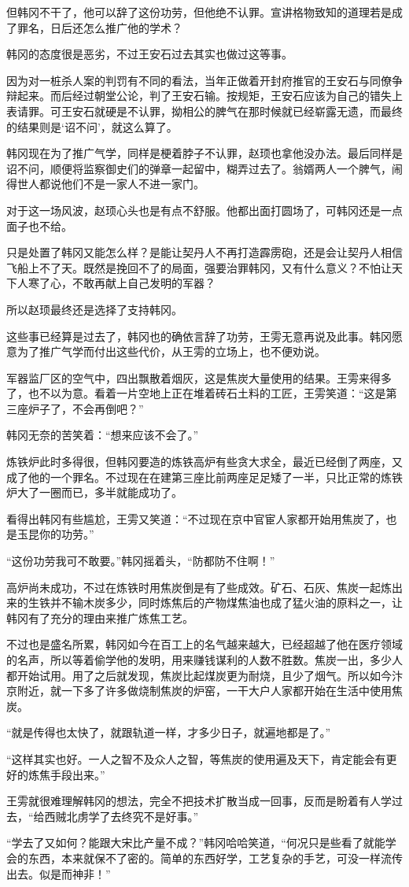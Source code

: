 但韩冈不干了，他可以辞了这份功劳，但他绝不认罪。宣讲格物致知的道理若是成了罪名，日后还怎么推广他的学术？

韩冈的态度很是恶劣，不过王安石过去其实也做过这等事。

因为对一桩杀人案的判罚有不同的看法，当年正做着开封府推官的王安石与同僚争辩起来。而后经过朝堂公论，判了王安石输。按规矩，王安石应该为自己的错失上表请罪。可王安石就硬是不认罪，拗相公的脾气在那时候就已经崭露无遗，而最终的结果则是‘诏不问’，就这么算了。

韩冈现在为了推广气学，同样是梗着脖子不认罪，赵顼也拿他没办法。最后同样是诏不问，顺便将监察御史们的弹章一起留中，糊弄过去了。翁婿两人一个脾气，闹得世人都说他们不是一家人不进一家门。

对于这一场风波，赵顼心头也是有点不舒服。他都出面打圆场了，可韩冈还是一点面子也不给。

只是处置了韩冈又能怎么样？是能让契丹人不再打造霹雳砲，还是会让契丹人相信飞船上不了天。既然是挽回不了的局面，强要治罪韩冈，又有什么意义？不怕让天下人寒了心，不敢再献上自己发明的军器？

所以赵顼最终还是选择了支持韩冈。

这些事已经算是过去了，韩冈也的确依言辞了功劳，王雱无意再说及此事。韩冈愿意为了推广气学而付出这些代价，从王雱的立场上，也不便劝说。

军器监厂区的空气中，四出飘散着烟灰，这是焦炭大量使用的结果。王雱来得多了，也不以为意。看着一片空地上正在堆着砖石土料的工匠，王雱笑道：“这是第三座炉子了，不会再倒吧？”

韩冈无奈的苦笑着：“想来应该不会了。”

炼铁炉此时多得很，但韩冈要造的炼铁高炉有些贪大求全，最近已经倒了两座，又成了他的一个罪名。不过现在在建第三座比前两座足足矮了一半，只比正常的炼铁炉大了一圈而已，多半就能成功了。

看得出韩冈有些尴尬，王雱又笑道：“不过现在京中官宦人家都开始用焦炭了，也是玉昆你的功劳。”

“这份功劳我可不敢要。”韩冈摇着头，“防都防不住啊！”

高炉尚未成功，不过在炼铁时用焦炭倒是有了些成效。矿石、石灰、焦炭一起炼出来的生铁并不输木炭多少，同时炼焦后的产物煤焦油也成了猛火油的原料之一，让韩冈有了充分的理由来推广炼焦工艺。

不过也是盛名所累，韩冈如今在百工上的名气越来越大，已经超越了他在医疗领域的名声，所以等着偷学他的发明，用来赚钱谋利的人数不胜数。焦炭一出，多少人都开始试用。用了之后就发现，焦炭比起煤炭更为耐烧，且少了烟气。所以如今汴京附近，就一下多了许多做烧制焦炭的炉窑，一干大户人家都开始在生活中使用焦炭。

“就是传得也太快了，就跟轨道一样，才多少日子，就遍地都是了。”

“这样其实也好。一人之智不及众人之智，等焦炭的使用遍及天下，肯定能会有更好的炼焦手段出来。”

王雱就很难理解韩冈的想法，完全不把技术扩散当成一回事，反而是盼着有人学过去，“给西贼北虏学了去终究不是好事。”

“学去了又如何？能跟大宋比产量不成？”韩冈哈哈笑道，“何况只是些看了就能学会的东西，本来就保不了密的。简单的东西好学，工艺复杂的手艺，可没一样流传出去。似是而神非！”

